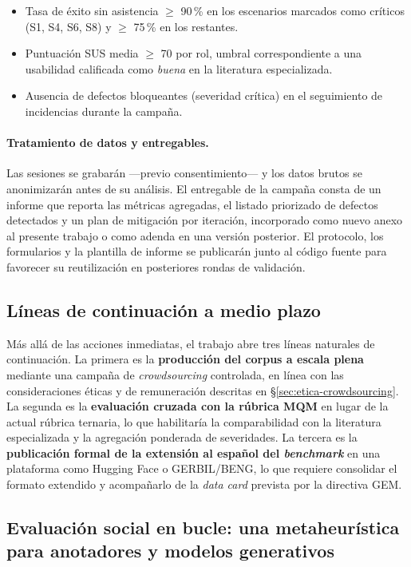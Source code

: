 \begin{itemize}
	\item Tasa de éxito sin asistencia $\geq$ 90\,\% en los escenarios marcados como
	      críticos (S1, S4, S6, S8) y $\geq$ 75\,\% en los restantes.
	\item Puntuación SUS media $\geq$ 70 por rol, umbral correspondiente a una
	      usabilidad calificada como \emph{buena} en la literatura especializada.
	\item Ausencia de defectos bloqueantes (severidad crítica) en el seguimiento de
	      incidencias durante la campaña.
\end{itemize}

\paragraph{Tratamiento de datos y entregables.} Las sesiones se grabarán
---previo consentimiento--- y los datos brutos se anonimizarán antes de su
análisis. El entregable de la campaña consta de un informe que reporta las
métricas agregadas, el listado priorizado de defectos detectados y un plan de
mitigación por iteración, incorporado como nuevo anexo al presente trabajo o
como adenda en una versión posterior. El protocolo, los formularios y la
plantilla de informe se publicarán junto al código fuente para favorecer su
reutilización en posteriores rondas de validación.

\subsection{Líneas de continuación a medio plazo}

Más allá de las acciones inmediatas, el trabajo abre tres líneas naturales de
continuación. La primera es la \textbf{producción del corpus a escala plena}
mediante una campaña de \textit{crowdsourcing} controlada, en línea con las
consideraciones éticas y de remuneración descritas en
\S\ref{sec:etica-crowdsourcing}. La segunda es la \textbf{evaluación cruzada
	con la rúbrica MQM} en lugar de la actual rúbrica ternaria, lo que habilitaría
la comparabilidad con la literatura especializada y la agregación ponderada de
severidades. La tercera es la \textbf{publicación formal de la extensión al
	español del \textit{benchmark}} en una plataforma como Hugging Face o
GERBIL/BENG, lo que requiere consolidar el formato extendido y acompañarlo de
la \textit{data card} prevista por la directiva GEM.

\subsection{Evaluación social en bucle: una metaheurística para anotadores
	y modelos generativos}
\label{sec:future-work-elo-social}

